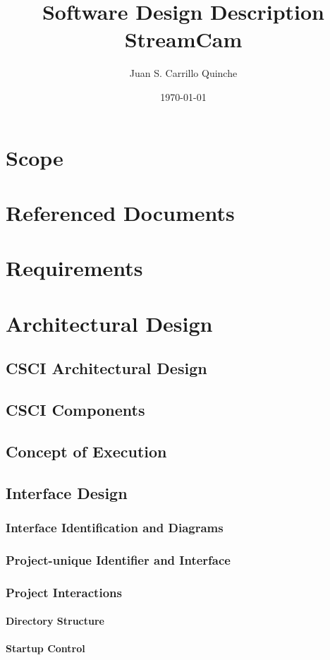 \documentclass[11pt,a4paper,titlepage]{article}
\title{\blue Software Design Description  \\
\blueb StreamCam}
\author{Juan S. Carrillo Quinche}
\date{\today}
\begin{document}
\maketitle

\section{Scope}
\section{Referenced Documents}
\section{Requirements}
\section{Architectural Design}
\subsection{CSCI Architectural Design}
\subsection{CSCI Components}
\subsection{Concept of Execution}
\subsection{Interface Design}
\subsubsection{Interface Identification and Diagrams}
\subsubsection{Project-unique Identifier and Interface}
\subsubsection{Project Interactions}
\paragraph{Directory Structure}
\paragraph{Startup Control}
\end{document}
